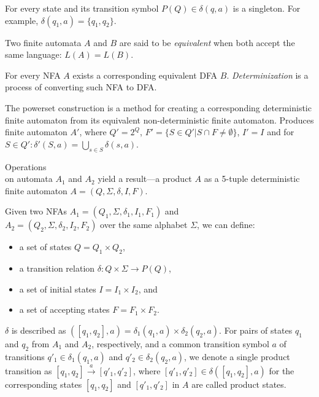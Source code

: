 For every state and its transition symbol $P(Q) \in \delta(q, a)$ is a singleton. For example, $\delta(q_1, a) = \{ q_1, q_2 \}$.

Two finite automata $A$ and $B$ are said to be \emph{equivalent} when both accept the same language: $L(A) = L(B)$.

For every NFA $A$ exists a corresponding equivalent DFA $B$. \emph{Determinization} is a process of converting such NFA to DFA.

\begin{definition}
    The powerset construction is a method for creating a corresponding deterministic finite automaton from its equivalent non-deterministic finite automaton. Produces finite automaton $A'$, where $Q' = 2^Q$, $F' = \{S \in Q' | S \cap F \neq \emptyset\}$, $I' = I$ and for $S \in Q': \delta'(S, a) = \bigcup_{s \in S} \delta(s, a)$.
\end{definition}

\begin{definition}
Operations \\ on automata $A_1$ and $A_2$ yield a result---a product $A$ as a 5-tuple deterministic finite automaton $A = (Q, \Sigma, \delta, I, F)$.

Given two NFAs $A_1 = (Q_1, \Sigma, \delta_1, I_1, F_1)$ and \\ $A_2 = (Q_2, \Sigma, \delta_2, I_2, F_2)$ over the same alphabet $\Sigma$, we can define:
\begin{itemize}
    \item a set of states $Q = Q_1 \times Q_2$,
    \item a transition relation $\delta: Q \times \Sigma \rightarrow{} P(Q)$,
    \item a set of initial states $I = I_1 \times I_2$, and
    \item a set of accepting states $F = F_1 \times F_2$.
\end{itemize}
\end{definition}

$\delta$ is described as $([q_1, q_2], a) = \delta_1(q_1, a) \times \delta_2(q_2, a)$. For pairs of states $q_1$ and $q_2$ from $A_1$ and $A_2$, respectively, and a common transition symbol $a$ of transitions $q'_1 \in \delta_1(q_1, a)$ and $q'_2 \in \delta_2(q_2,a)$, we denote a single product transition as $[q_1, q_2] \xrightarrow{a} [q'_1, q'_2]$, where $[q'_1, q'_2] \in \delta([q_1, q_2], a)$ for the corresponding states $[q_1, q_2]$ and $[q'_1, q'_2]$ in $A$ are called product states.

